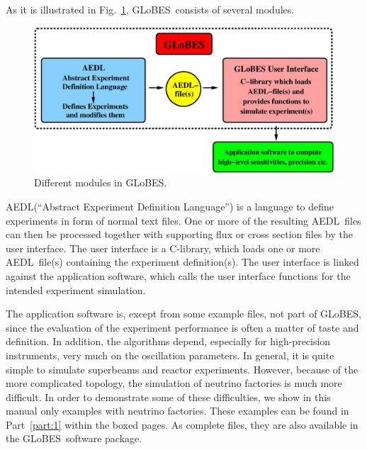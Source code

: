 \documentclass[a4paper,12pt,twoside]{book}
\newcommand{\fig}{Fig.}
\newcommand{\Part}{Part}
\newcommand{\GLOBES}{{\sf GLoBES}}
\newcommand{\AEDL}{{\sf AEDL}}
\newcommand{\figu}[1]{\fig~\ref{fig:#1}}
\begin{document}
As it is illustrated in \figu{GLOBES}, \GLOBES\ consists 
of several modules.
%
\begin{figure}[bht]
\begin{center}
\includegraphics[width=16cm]{GLOBES}
\end{center}
\caption{\label{fig:GLOBES} Different modules in \GLOBES .}
\end{figure}
%
\AEDL (``Abstract Experiment Definition Language'') is a language
to define experiments in form of normal text files. One or more of 
the resulting \AEDL\ files can then be processed together with supporting 
flux or cross section files by the user interface. The user interface
is a C-library, which loads one or more \AEDL\ file(s)
containing the experiment definition(s). The user interface is linked 
against the application software, which calls the user interface functions
for the intended experiment simulation. 

The application 
software is, except from some example files, not part of \GLOBES , since
the evaluation of the experiment performance is often a matter of taste
and definition. In addition, the algorithms depend, especially for
high-precision instruments, very much on the oscillation parameters.
In general, it is quite simple to simulate superbeams and reactor
experiments. However, because of the more complicated topology, the
simulation of neutrino factories is much more difficult. In order
to demonstrate some of these difficulties, we show in this manual only
examples with neutrino factories. These examples can be found in
\Part~\ref{part:1} within the boxed pages. As complete files, they
are also available in the \GLOBES\ software package.
\end{document}
